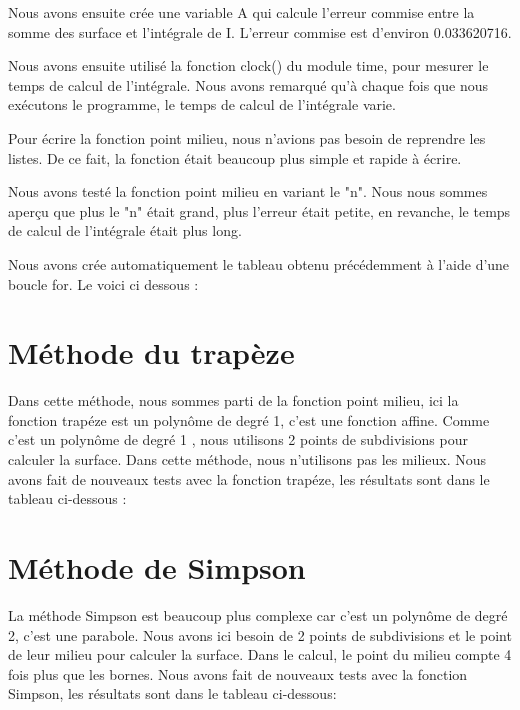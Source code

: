 \documentclass{article}
\begin{document}
Nous avons ensuite crée une variable A qui calcule l'erreur commise entre la somme des surface et l'intégrale de I. L'erreur commise est d'environ 0.033620716.
\newline
\newline

Nous avons ensuite utilisé la fonction clock() du module time, pour mesurer le temps de calcul de l'intégrale. Nous avons remarqué qu'à chaque fois que nous exécutons le programme, le temps de calcul de l'intégrale varie.
\newline
\newline

Pour écrire la fonction point milieu, nous n'avions pas besoin de reprendre les listes. De ce fait, la fonction était beaucoup plus simple et rapide à écrire.
\newline
\newline

Nous avons testé la fonction point milieu en variant le "n". Nous nous sommes aperçu que plus le "n" était grand, plus l'erreur était petite, en revanche, le temps de calcul de l'intégrale était plus long.
\newline
\newline

Nous avons crée automatiquement le tableau obtenu précédemment à l'aide d'une boucle for. Le voici ci dessous :
$$ $$
$$ $$
$$ $$
$$ $$

\section{Méthode du trapèze}
$$ $$
Dans cette méthode, nous sommes parti de la fonction point milieu, ici la fonction trapéze est un polynôme de degré 1, c'est une fonction affine. Comme c'est un polynôme de degré 1 , nous utilisons 2 points de subdivisions pour calculer la surface. Dans cette méthode, nous n'utilisons pas les milieux.
Nous avons fait de nouveaux tests avec la fonction trapéze, les résultats sont dans le tableau ci-dessous :

\section{Méthode de Simpson}
$$ $$
La méthode Simpson est beaucoup plus complexe car c'est un polynôme de degré 2, c'est une parabole. Nous avons ici besoin de 2 points de subdivisions et le point de leur milieu pour calculer la surface. Dans le calcul, le point du milieu compte 4 fois plus que les bornes. Nous avons fait de nouveaux tests avec la fonction Simpson, les résultats sont dans le tableau ci-dessous:
\end{document}
